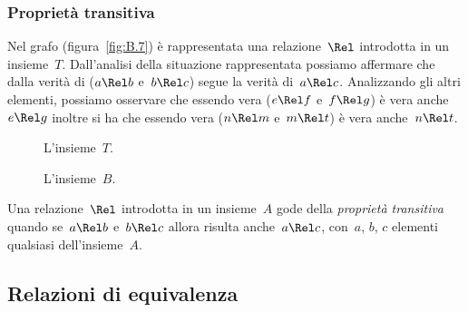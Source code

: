 
\subsubsection{Proprietà transitiva}

\begin{exrig}
 \begin{esempio}

Nel grafo (figura~\ref{fig:B.7}) è rappresentata una relazione~\(\Rel\) introdotta 
in un insieme~\(T\). Dall'analisi della situazione rappresentata possiamo
affermare che dalla verità di (\(a \Rel b\) e~\(b \Rel c\)) segue la verità di~\(a 
\Rel c\). Analizzando gli altri elementi, 
possiamo osservare che essendo vera (\(e \Rel f\) e~\(f \Rel g\)) è vera anche~\(e 
\Rel g\)
inoltre si ha che essendo vera (\(n \Rel m\) e~\(m \Rel t\)) è vera anche~\(n \Rel 
t\).
 \end{esempio}
\end{exrig}

\begin{inaccessibleblock}
 \begin{figure}[t]
\begin{minipage}[b]{.45\textwidth}
 \centering
 
 \caption{L'insieme~\(T\).}\label{fig:B.7}
\end{minipage}\hfil
\begin{minipage}[b]{.45\textwidth}
 \centering
 
 \caption{L'insieme~\(B\).}\label{fig:B.8}
\end{minipage}


\end{figure}
\end{inaccessibleblock}

\begin{definizione}
Una relazione~\(\Rel\) introdotta in un insieme~\(A\) gode della \emph{proprietà 
transitiva} quando se~\(a \Rel b\) e~\(b \Rel c\)
allora risulta anche~\(a \Rel c\), con~\(a\), \(b\), \(c\) elementi qualsiasi 
dell'insieme~\(A\).
\end{definizione}


\subsection{Relazioni di equivalenza}
\label{subsec:rel_equivalenza}

